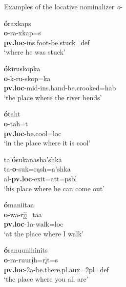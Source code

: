 \begin{exe}

\item\label{LocNomEx} Examples of the locative nominalizer \textit{o}-

    \begin{xlist}
    
    \item\label{LocNomEx1} \glll \textbf{ó}raxkaps\\
    \textbf{o}-ra-xkap=s\\
    \textbf{pv.loc}-ins.foot-\textnormal{be.stuck}=def\\
    \glt `where he was stuck' \citep[46]{hollow1973a}
    
    \item\label{LocNomEx2} \glll \textbf{ó}kiruskopka\\
    \textbf{o}-k-ru-skop=ka\\
    \textbf{pv.loc}-mid-ins.hand-\textnormal{be.crooked}=hab\\
    \glt `the place where the river bends' \citep[47]{hollow1973a}
    
    \item\label{LocNomEx3} \glll \textbf{ó}taht\\
    \textbf{o}-tah=t\\
    \textbf{pv.loc}-\textnormal{be.cool}=loc\\
    \glt `in the place where it is cool' \citep[53]{hollow1973a}   
    
    \item\label{LocNomEx4} \glll ta'\textbf{ó}sukanasha'shka\\
    ta-\textbf{o}-suk=rąsh=a'shka\\
    al-\textbf{pv.loc}-\textnormal{exit}=att=psbl\\
    \glt `his place where he can come out' \citep[98]{hollow1973a}
    
    \item\label{LocNomEx5} \glll \textbf{ó}maniitaa\\
    \textbf{o}-wa-rįį=taa\\
    \textbf{pv.loc}-1a-\textnormal{walk}=loc\\
    \glt `at the place where I walk' \citep[114]{hollow1973a}
    
    \item\label{LocNomEx6} \glll \textbf{ó}ranuunihinits\\
    \textbf{o}-ra-ruurįh=rįt=s\\
    \textbf{pv.loc}-2a-\textnormal{be.there}.pl.aux=2pl=def\\
    \glt `the place where you all are' \citep[130]{hollow1973a}
    
    \end{xlist}

\end{exe}

